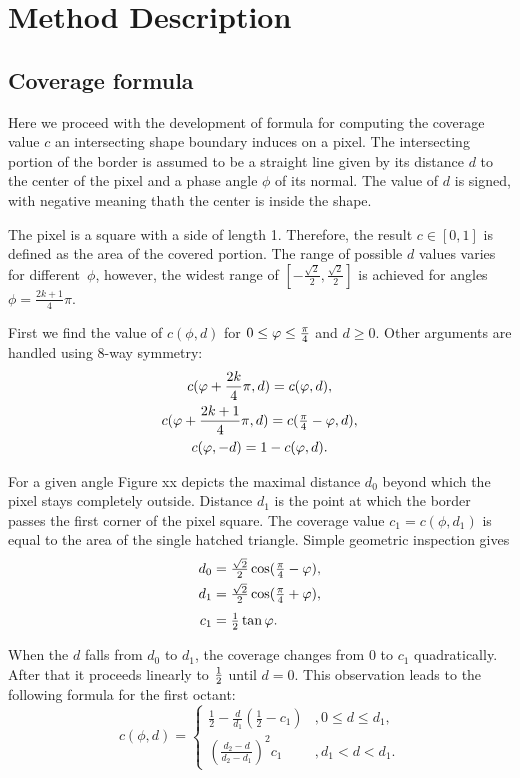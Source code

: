 \section{Method Description}

\subsection{Coverage formula}

Here we proceed with the development of formula for computing the coverage value $c$ an intersecting shape boundary induces on a pixel. The intersecting portion of the border is assumed to be a straight line given by its distance $d$ to the center of the pixel and a phase angle $\phi$ of its normal. The value of $d$ is signed, with negative meaning thath the center is inside the shape.

The pixel is a square with a side of length 1. Therefore, the result $c \in [0, 1]$ is defined as the area of the covered portion. The range of possible $d$ values varies for different~$\phi$, however, the widest range of $[-\frac{\sqrt{2}}{2}, \frac{\sqrt{2}}{2}]$ is achieved for angles $\phi = \frac{2k + 1}{4} \pi$.

First we find the value of $c(\phi, d)$ for $0 \leq \varphi \leq \tfrac{\pi}{4}$ and $d \geq 0$. Other arguments are handled using 8-way symmetry:
\begin{gather}
	c(\varphi + \frac{2k}{4}\pi, d) = c(\varphi, d), \\
    c(\varphi + \frac{2k+1}{4}\pi, d) = c(\tfrac{\pi}{4} - \varphi, d), \\
    c(\varphi, -d) = 1 - c(\varphi, d).
\end{gather}

For a given angle Figure xx depicts the maximal distance $d_0$ beyond which the pixel stays completely outside. Distance $d_1$ is the point at which the border passes the first corner of the pixel square. The coverage value $c_1 = c(\phi, d_1)$ is equal to the area of the single hatched triangle. Simple geometric inspection gives
\begin{equation}\begin{split}
	d_0 &= \tfrac{\sqrt{2}}{2}\cos(\tfrac{\pi}{4} - \varphi), \\
    d_1 &= \tfrac{\sqrt{2}}{2}\cos(\tfrac{\pi}{4} + \varphi), \\[3pt]
    c_1 &= \tfrac{1}{2} \tan\varphi.
\end{split}\end{equation}

When the $d$ falls from $d_0$ to $d_1$, the coverage changes from 0 to $c_1$ quadratically. After that it proceeds linearly to $\tfrac{1}{2}$ until $d = 0$. This observation leads to the following formula for the first octant:
\begin{equation}
	c(\phi, d) = \begin{cases}
		\frac{1}{2} - \frac{d}{d_1}\left(\frac{1}{2} - c_1\right)
        	&, 0 \leq d \leq d_1, \\[6pt]
        \left(\frac{d_2 - d}{d_2 - d_1}\right)^2 c_1
        	&, d_1 < d < d_1.
	\end{cases}
\end{equation}